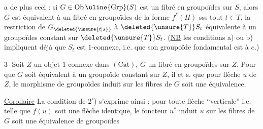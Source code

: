 
a de plus ceci : si $G\in\mathrm{Ob}\,\uline{\mathrm{Grp}}(S)$ est un fibré en groupoïdes sur $S$, alors $G$ est équivalent à un fibré en groupoïdes de la forme $f^*(H)$ sss   tout $t\in T$, la restriction  de $G_{\deleted{\unsure{t|s}}}$ à $\deleted{\unsure{T}}S_t$  équivalente à un  groupoïdes constant sur $\deleted{\unsure{T}}S_t$. (\uline{NB} les conditions a) ou b) impliquent déjà que $S_t$ est $1$-connexe, i.e. que son groupoïde fondamental est  à $e$.)

\textcircled{3} Soit $Z$ un objet $1$-connexe dans $(\mathrm{Cat})$,  $G$ un fibré en groupoïdes sur $Z$. Pour que $G$ soit équivalent à un groupoïde constant sur $Z$, il  et s. que pour  flèche $u$ de $Z$,  le  morphisme de groupoïdes  induit sur les fibres de $G$ soit une équivalence.



\uline{Corollaire} La condition  de $2^{\circ}$) s'exprime ainsi : pour toute flèche  ``verticale''   i.e. telle que $f(u)$ soit une flèche identique, le foncteur $u^*$ induit  $u$ sur les fibres de $G$ soit une équivalence de groupoïdes

